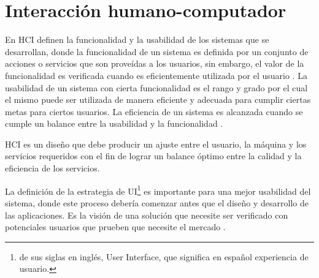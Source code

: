 \section{Interacción humano-computador}
En HCI definen la funcionalidad y la usabilidad de los sistemas que se desarrollan, donde la funcionalidad de un sistema es definida por un conjunto de acciones o servicios que son proveídas a los usuarios, sin embargo, el valor de la funcionalidad es verificada cuando es eficientemente utilizada por el usuario \citep{shneiderman_designing_2010}. La usabilidad de un sistema con cierta funcionalidad es el rango y grado por el cual el mismo puede ser utilizada de manera eficiente y adecuada para cumplir ciertas metas para ciertos usuarios. La eficiencia de un sistema es alcanzada cuando se cumple un balance entre la usabilidad y la funcionalidad \citep{nielsen_usability_2010}.

HCI es un diseño que debe producir un ajuste entre el usuario, la máquina y los servicios requeridos con el fin de lograr un balance óptimo entre la calidad y la eficiencia de los servicios.

La definición de la estrategia de UI\footnote{de sus siglas en inglés, User Interface, que significa en español experiencia de usuario.} es importante para una mejor usabilidad del sistema, donde este proceso debería comenzar antes que el diseño y desarrollo de las aplicaciones. Es la visión de una solución que necesite ser verificado con potenciales usuarios que prueben que necesite el mercado \citep{levy_ux_2015}.